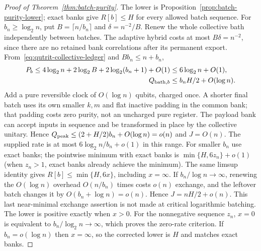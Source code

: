 \begin{proof}[Proof of Theorem~\ref{thm:batch-purity}]
The lower is Proposition~\ref{prop:batch-purity-lower}; exact banks
give $R[b]\leq H$ for every allowed batch sequence.
For $b_n\geq\log_2n$, put $B=\lceil n/b_n\rceil$ and
$\delta=n^{-2}/B$. Renew the whole collective bath independently
between batches. The adaptive hybrid costs at most $B\delta=n^{-2}$,
since there are no retained bank correlations after its permanent
export. From~\eqref{eq:qutrit-collective-ledger} and $Bb_n\leq n+b_n$,
\begin{align*}
 P_b\leq4\log_2n+2\log_2B+2\log_2(b_n+1)+O(1)
       &\leq6\log_2n+O(1),\\
 Q_{{\rm bath},b}&\leq b_nH/2+O(\log n).
\end{align*}
Add a pure reversible clock of $O(\log n)$ qubits, charged once.
A shorter final batch uses its own smaller $k,m$ and flat inactive
padding in the common bank; that padding costs zero purity, not
an uncharged pure register. The payload bank can accept inputs in sequence and be transformed
in place by the collective unitary. Hence
$Q_{\rm peak}\leq(2+H/2)b_n+O(\log n)=o(n)$ and $J=O(n)$.
The supplied rate is at most
$6\log_2n/b_n+o(1)$ in this range. For smaller $b_n$ use exact banks;
the pointwise minimum with exact banks is
$\min\{H,6z_n\}+o(1)$ (when $z_n>1$, exact banks already
achieve the minimum). The same limsup identity gives
$R[b]\leq\min\{H,6x\}$, including $x=\infty$.
If $b_n/\log n\to\infty$, renewing the $O(\log n)$ overhead
$O(n/b_n)$ times costs $o(n)$ exchange, and the leftover batch
changes it by $O(b_n+\log n)=o(n)$. Hence $J=nH/2+o(n)$.
This last near-minimal exchange assertion is not made at critical
logarithmic batching. The lower is positive exactly when $x>0$. For the nonnegative
sequence $z_n$, $x=0$ is equivalent to $b_n/\log_2n\to\infty$,
which proves the zero-rate criterion. If $b_n=o(\log n)$ then
$x=\infty$, so the corrected lower is $H$ and matches exact banks.
\end{proof}

